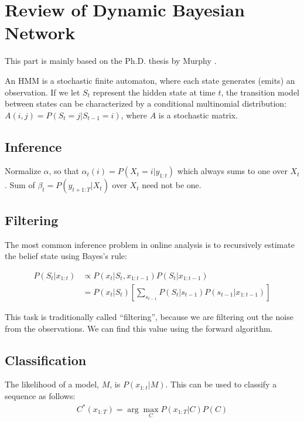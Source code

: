\chapter{Review of Dynamic Bayesian Network}
This part is mainly based on the Ph.D. thesis by Murphy \cite{murphy02}.

An HMM is a stochastic finite automaton, where each state generates (emits) an
observation. If we let $S_t$ represent the hidden state at time $t$, the
transition model between states can be characterized by a conditional
multinomial distribution: $A(i, j) = P(S_t = j | S_{t-1} = i)$, where $A$ is a
stochastic matrix.

\section{Inference}
Normalize $\alpha$, so that $\alpha_t(i) = P(X_t = i | y_{1:t})$ which always
sums to one over $X_t$. Sum of $\beta_t = P(y_{t+1:T}|X_t)$ over $X_t$ need not
be one.

\section{Filtering}
The most common inference problem in online analysis is to recursively estimate
the belief state using Bayes's rule:

\begin{align*}
P(S_t | x_{1:t}) & \propto P(x_t | S_t, x_{1:t-1})P(S_t | x_{1:t-1}) \\
         & = P(x_t | S_t) \left[\sum_{s_{t - 1}}
           P(S_t | s_{t - 1})P(s_{t - 1} | x_{1:t - 1})\right]
\end{align*}

This task is traditionally called ``filtering'', because we are filtering out
the noise from the observations. We can find this value using the forward
algorithm.

\section{Classification}
The likelihood of a model, $M$, is $P(x_{1:t}|M)$. This can be used to classify
a sequence as follows:
\begin{align*}
C^*(x_{1:T}) = \arg \max_{C} P(x_{1:T} | C)P(C)
\end{align*}